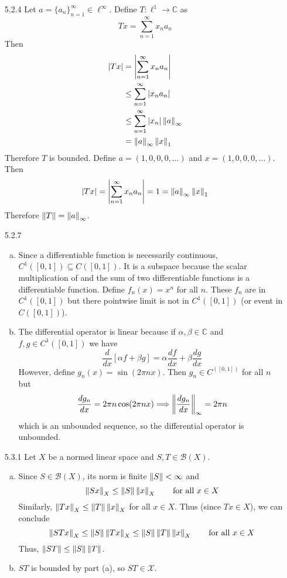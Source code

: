 \documentclass[../../Solutions.tex]{subfiles}
\begin{document}
\begin{itemize}
	\item [5.2.4] Let $a = \{a_n\}_{n=1}^\infty \in \ell^\infty$. Define $T:\ell^1\to\mathbb{C}$ as
		$$ Tx = \sum_{n=1}^\infty x_na_n $$
		Then
		\begin{equation*} \begin{split} 
			|Tx| &= \left|\sum_{n=1}^\infty x_n a_n\right| \\
				&\leq \sum_{n=1}^\infty |x_n a_n| \\
				&\leq \sum_{n=1}^\infty |x_n|\left\lVert a\right\rVert_\infty \\
				&= \left\lVert a\right\rVert_\infty \left\lVert x\right\rVert_1
		\end{split} \end{equation*}
		Therefore $T$ is bounded.
		Define $a = (1,0,0,0,\dots)$ and $x = (1,0,0,0,\dots)$. Then
		$$ |Tx| = \left|\sum_{n=1}^\infty x_n a_n\right| = 1 = \left\lVert a\right\rVert_\infty \left\lVert x\right\rVert_1 $$
		Therefore $\left\lVert T\right\rVert = \left\lVert a\right\rVert_\infty$.
		
	\item [5.2.7]
	\begin{enumerate}[(a)]
		\item Since a differentiable function is necessarily continuous, $C^1([0,1]) \subseteq C([0,1])$.
			It is a subspace because the scalar multiplication of and the sum of two differentiable functions is a differentiable function.
			Define $f_n(x) = x^n$ for all $n$. These $f_n$ are in $C^1([0,1])$ but there pointwise limit is not in $C^1([0,1])$ (or event in $C([0,1])$).
		\item The differential operator is linear because if $\alpha,\beta \in \mathbb{C}$ and $f,g \in C^1([0,1])$ we have
		$$ \frac{d}{dx}\left[\alpha f + \beta g\right] = \alpha \frac{df}{dx} + \beta \frac{dg}{dx} $$
		However, define $g_n(x) = \sin(2\pi nx)$. Then $g_n \in C^([0,1])$ for all $n$ but
		$$ \frac{dg_n}{dx} = 2\pi n\cos(2\pi nx) \Longrightarrow \left\lVert\frac{dg_n}{dx}\right\rVert_\infty = 2\pi n $$
		which is an unbounded sequence, so the differential operator is unbounded.
	\end{enumerate}
	
	\item [5.3.1] Let $X$ be a normed linear space and $S,T \in \mathcal{B}(X)$.
	\begin{enumerate}[(a)]
		\item Since $S \in \mathcal{B}(X)$, its norm is finite $\left\lVert S\right\rVert < \infty$ and 
			$$ \left\lVert Sx\right\rVert_X \leq \left\lVert S\right\rVert\left\lVert x\right\rVert_X \qquad\text{for all } x\in X $$
			Similarly, $ \left\lVert Tx\right\rVert_X \leq \left\lVert T\right\rVert\left\lVert x\right\rVert_X$ for all $x \in X$.
			Thus (since $Tx \in X$), we can conclude
			$$ \left\lVert STx\right\rVert_X \leq \left\lVert S\right\rVert\left\lVert Tx\right\rVert_X \leq \left\lVert S\right\rVert\left\lVert T\right\rVert\left\lVert x\right\rVert_X \qquad\text{for all } x \in X $$
			Thus, $\left\lVert ST\right\rVert \leq \left\lVert S\right\rVert\left\lVert T\right\rVert$.
		\item $ST$ is bounded by part (a), so $ST \in \mathcal{X}$.
	\end{enumerate}
	

\end{itemize}
\end{document}

